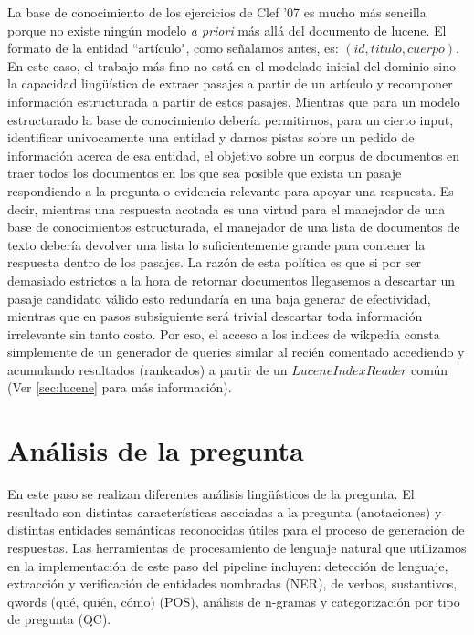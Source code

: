 \bigskip

La base de conocimiento de los ejercicios de Clef '07 es mucho más sencilla 
porque no existe ningún modelo \emph{a priori} más allá del documento de lucene.
El formato de la entidad ``artículo", como señalamos antes, es: $(id, titulo, cuerpo)$. 
En este caso, el trabajo más fino no está en el modelado inicial del dominio 
sino la capacidad lingüística de extraer pasajes a partir de un artículo y recomponer información
estructurada a partir de estos pasajes. Mientras que para un modelo estructurado la base de conocimiento
debería permitirnos, para un cierto input, identificar univocamente una entidad y darnos pistas sobre un pedido de
información acerca de esa entidad, el objetivo sobre un corpus de documentos en 
traer todos los documentos en los que sea posible que exista un pasaje respondiendo a la pregunta o
evidencia relevante para apoyar una respuesta. Es decir, mientras una respuesta acotada es una virtud para
el manejador de una base de conocimientos estructurada, el manejador de una lista de documentos de texto debería devolver
una lista lo suficientemente grande para contener la respuesta dentro de los pasajes. La razón de esta política es que si
por ser demasiado estrictos a la hora de retornar documentos llegasemos a descartar un pasaje candidato válido esto
redundaría en una baja generar de efectividad, mientras que en pasos subsiguiente será trivial descartar toda información irrelevante
sin tanto costo. Por eso, el acceso a los indices de wikpedia consta simplemente de un generador de queries similar al recién comentado
accediendo y acumulando resultados (rankeados) a partir de un $LuceneIndexReader$ común (Ver \ref{sec:lucene}  para más información).


\bigskip

\section{Análisis de la pregunta}
\label{sec:qprocess}
En este paso se realizan diferentes análisis lingüísticos de la pregunta.
El resultado son distintas características asociadas a la pregunta (anotaciones)
y distintas entidades semánticas reconocidas útiles para el proceso de generación de respuestas. 
Las herramientas de procesamiento de lenguaje natural que utilizamos en 
la implementación de este paso del pipeline 
incluyen: detección de lenguaje, extracción y verificación de entidades nombradas (NER), 
de verbos, sustantivos, qwords (qué, quién, cómo) (POS), análisis de n-gramas y categorización por tipo de pregunta (QC).

